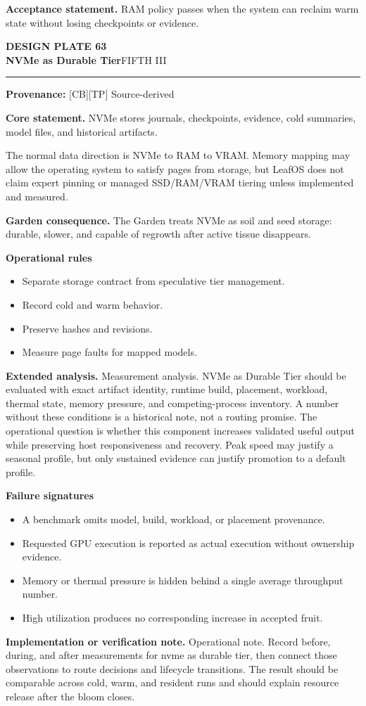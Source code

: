 \documentclass[10pt,letterpaper,oneside]{article}
\newcommand{\prov}[1]{\textcolor{gardenBlue}{\sffamily\footnotesize\textbf{Provenance:} #1}}
\newcommand{\platetitle}[3]{%
  \begin{minipage}[t][0.54in][t]{\textwidth}
  {\sffamily\bfseries\color{gardenDeep}\fontsize{9}{10}\selectfont DESIGN PLATE #1}\\[-1pt]
  {\sffamily\bfseries\color{gardenInk}\fontsize{16.5}{18}\selectfont #2}\hfill{\sffamily\color{gardenGreen}\large #3}
  \end{minipage}\vspace{-2pt}\hrule\vspace{5pt}}
\begin{document}
\begin{acceptbox}
\textbf{Acceptance statement.} RAM policy passes when the system can reclaim warm state without losing checkpoints or evidence.
\end{acceptbox}
\newpage
\platetitle{63}{NVMe as Durable Tier}{FIFTH III}
\prov{[CB][TP] Source-derived}
\fontsize{8.85}{10.45}\selectfont
\begin{corebox}
\textbf{Core statement.} NVMe stores journals, checkpoints, evidence, cold summaries, model files, and historical artifacts.
\end{corebox}
The normal data direction is NVMe to RAM to VRAM. Memory mapping may allow the operating system to satisfy pages from storage, but LeafOS does not claim expert pinning or managed SSD/RAM/VRAM tiering unless implemented and measured.

\textbf{Garden consequence.} The Garden treats NVMe as soil and seed storage: durable, slower, and capable of regrowth after active tissue disappears.

\textbf{Operational rules}
\begin{itemize}
\item Separate storage contract from speculative tier management.
\item Record cold and warm behavior.
\item Preserve hashes and revisions.
\item Measure page faults for mapped models.
\end{itemize}
\textbf{Extended analysis.} Measurement analysis. NVMe as Durable Tier should be evaluated with exact artifact identity, runtime build, placement, workload, thermal state, memory pressure, and competing-process inventory. A number without these conditions is a historical note, not a routing promise. The operational question is whether this component increases validated useful output while preserving host responsiveness and recovery. Peak speed may justify a seasonal profile, but only sustained evidence can justify promotion to a default profile.

\textbf{Failure signatures}
\begin{itemize}
\item A benchmark omits model, build, workload, or placement provenance.
\item Requested GPU execution is reported as actual execution without ownership evidence.
\item Memory or thermal pressure is hidden behind a single average throughput number.
\item High utilization produces no corresponding increase in accepted fruit.
\end{itemize}
\textbf{Implementation or verification note.} Operational note. Record before, during, and after measurements for nvme as durable tier, then connect those observations to route decisions and lifecycle transitions. The result should be comparable across cold, warm, and resident runs and should explain resource release after the bloom closes.
\end{document}
